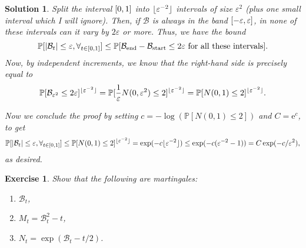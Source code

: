 \documentclass{article}
\newtheorem{ex}{Exercise}
\theoremstyle{nonumberplain}
\newtheorem{sol}{Solution}
\newcommand{\e}{\mathrm{e}}
\DeclarePairedDelimiter{\abs}{\lvert}{\rvert}
\DeclarePairedDelimiter{\floor}{\lfloor}{\rfloor}
\newcommand{\PP}{\mathbb{P}}
\newcommand{\Brwn}{\mathcal{B}}
\begin{document}
\begin{sol}
Split the interval $\interval01$ into $\floor{\varepsilon^{-2}}$ intervals of size $\varepsilon^2$ (plus one small interval which I will ignore). Then, if $\Brwn$ is always in the band $\interval{-\varepsilon}\varepsilon$, in none of these intervals can it vary by $2\varepsilon$ or more. Thus, we have the bound
\begin{equation}
\PP[\abs{\Brwn_t} \leq \varepsilon, \forall_{t \in \interval01}] \leq \PP[\text{$\Brwn_{\text{end}} - \Brwn_{\text{start}} \leq 2\varepsilon$ for all these intervals}].
\end{equation}
Now, by independent increments, we know that the right-hand side is precisely equal to
\begin{equation}
\PP[\Brwn_{\varepsilon^2} \leq 2 \varepsilon]^{\floor{\varepsilon^{-2}}} = \PP[\frac1\varepsilon N(0,\varepsilon^2) \leq 2 ]^{\floor{\varepsilon^{-2}}} = \PP[N(0,1) \leq 2]^{\floor{\varepsilon^{-2}}}.
\end{equation}

Now we conclude the proof by setting $c = - \log(\PP[N(0,1) \leq 2])$ and $C = \e^c$, to get
\begin{equation}
\PP[\abs{\Brwn_t} \leq \varepsilon, \forall_{t \in \interval01}] \leq \PP[N(0,1) \leq 2]^{\floor{\varepsilon^{-2}}} = \exp(-c \floor{\varepsilon^{-2}}) \leq \exp(-c(\varepsilon^{-2} - 1)) = C \exp(-c/\varepsilon^2),
\end{equation}
as desired.
\end{sol}

\begin{ex}
Show that the following are martingales:
\begin{enumerate}
\item $\Brwn_t$,
\item $M_t = \Brwn_t^2 - t$,
\item $N_t = \exp(\Brwn_t - t/2)$.
\end{enumerate}
\end{ex}
\end{document}
